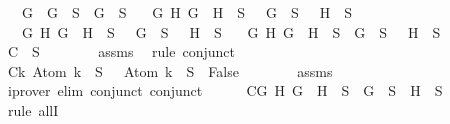 \begin{isabellebody}
\ \ {\isasymand}\ {\isacharparenleft}{\isasymforall}G{\isachardot}\ \isactrlbold {\isasymnot}\ {\isacharparenleft}\isactrlbold {\isasymnot}G{\isacharparenright}\ {\isasymin}\ S\ {\isasymlongrightarrow}\ G\ {\isasymin}\ S{\isacharparenright}\isanewline
\ \ {\isasymand}\ {\isacharparenleft}{\isasymforall}G\ H{\isachardot}\ \isactrlbold {\isasymnot}{\isacharparenleft}G\ \isactrlbold {\isasymand}\ H{\isacharparenright}\ {\isasymin}\ S\ {\isasymlongrightarrow}\ \isactrlbold {\isasymnot}\ G\ {\isasymin}\ S\ {\isasymor}\ \isactrlbold {\isasymnot}\ H\ {\isasymin}\ S{\isacharparenright}\isanewline
\ \ {\isasymand}\ {\isacharparenleft}{\isasymforall}G\ H{\isachardot}\ \isactrlbold {\isasymnot}{\isacharparenleft}G\ \isactrlbold {\isasymor}\ H{\isacharparenright}\ {\isasymin}\ S\ {\isasymlongrightarrow}\ \isactrlbold {\isasymnot}\ G\ {\isasymin}\ S\ {\isasymand}\ \isactrlbold {\isasymnot}\ H\ {\isasymin}\ S{\isacharparenright}\isanewline
\ \ {\isasymand}\ {\isacharparenleft}{\isasymforall}G\ H{\isachardot}\ \isactrlbold {\isasymnot}{\isacharparenleft}G\ \isactrlbold {\isasymrightarrow}\ H{\isacharparenright}\ {\isasymin}\ S\ {\isasymlongrightarrow}\ G\ {\isasymin}\ S\ {\isasymand}\ \isactrlbold {\isasymnot}\ H\ {\isasymin}\ S{\isacharparenright}{\isachardoublequoteclose}\isanewline
\ \ \isamarkupfalse%
\ {\isacharminus}\isanewline
\ \ \ \ \isamarkupfalse%
\ C{}{\isacharcolon}{\isachardoublequoteopen}{\isasymbottom}\ {\isasymnotin}\ S{\isachardoublequoteclose}\isanewline
\ \ \ \ \ \ \isamarkupfalse%
\ assms\ \isamarkupfalse%
\ {\isacharparenleft}rule\ conjunct{}{\isacharparenright}\isanewline
\ \ \ \ \isamarkupfalse%
\ C{}{\isacharcolon}{\isachardoublequoteopen}{\isasymforall}k{\isachardot}\ Atom\ k\ {\isasymin}\ S\ {\isasymlongrightarrow}\ \isactrlbold {\isasymnot}\ {\isacharparenleft}Atom\ k{\isacharparenright}\ {\isasymin}\ S\ {\isasymlongrightarrow}\ False{\isachardoublequoteclose}\isanewline
\ \ \ \ \ \ \isamarkupfalse%
\ assms\ \isamarkupfalse%
\ {\isacharparenleft}iprover\ elim{\isacharcolon}\ conjunct{}\ conjunct{}{\isacharparenright}\isanewline
\ \ \ \ \isamarkupfalse%
\ C{}{\isacharcolon}{\isachardoublequoteopen}{\isasymforall}G\ H{\isachardot}\ G\ \isactrlbold {\isasymand}\ H\ {\isasymin}\ S\ {\isasymlongrightarrow}\ G\ {\isasymin}\ S\ {\isasymand}\ H\ {\isasymin}\ S{\isachardoublequoteclose}\isanewline
\ \ \ \ \isamarkupfalse%
\ {\isacharparenleft}rule\ allI{\isacharparenright}{\isacharplus}\isanewline

\end{isabellebody}

